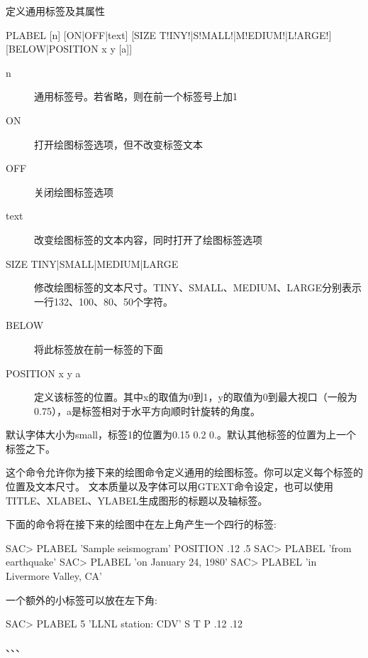 \label{cmd:plabel}

定义通用标签及其属性

\begin{SACSTX}
PLABEL [n] [ON|OFF|text] [SIZE T!INY!|S!MALL!|M!EDIUM!|L!ARGE!]
    [BELOW|POSITION x y [a]]
\end{SACSTX}

\begin{description}
\item [n] 通用标签号。若省略，则在前一个标签号上加1
\item [ON] 打开绘图标签选项，但不改变标签文本
\item [OFF] 关闭绘图标签选项
\item [text] 改变绘图标签的文本内容，同时打开了绘图标签选项
\item [SIZE TINY|SMALL|MEDIUM|LARGE] 修改绘图标签的文本尺寸。TINY、SMALL、MEDIUM、LARGE分别表示
    一行132、100、80、50个字符。
\item [BELOW] 将此标签放在前一标签的下面
\item [POSITION x y a] 定义该标签的位置。其中x的取值为0到1，y的取值为0到最大视口（一般为0.75），a是标签相对于水平方向顺时针旋转的角度。
\end{description}

默认字体大小为small，标签1的位置为0.15 0.2 0.。默认其他标签的位置为上一个标签之下。

这个命令允许你为接下来的绘图命令定义通用的绘图标签。你可以定义每个标签的位置及文本尺寸。
文本质量以及字体可以用GTEXT命令设定，也可以使用TITLE、XLABEL、YLABEL生成图形的标题以及轴标签。

下面的命令将在接下来的绘图中在左上角产生一个四行的标签:
\begin{SACCode}
SAC> PLABEL 'Sample seismogram' POSITION .12 .5
SAC> PLABEL 'from earthquake'
SAC> PLABEL 'on January 24, 1980'
SAC> PLABEL 'in Livermore Valley, CA'
\end{SACCode}

一个额外的小标签可以放在左下角:
\begin{SACCode}
SAC> PLABEL 5 'LLNL station: CDV' S T P .12 .12
\end{SACCode}

、、、
